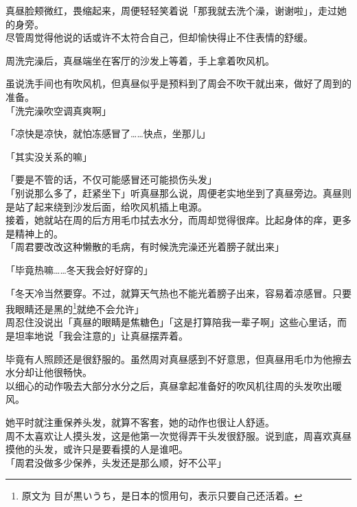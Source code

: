 真昼脸颊微红，畏缩起来，周便轻轻笑着说「那我就去洗个澡，谢谢啦」，走过她的身旁。\\

尽管周觉得他说的话或许不太符合自己，但却愉快得止不住表情的舒缓。\\

\vspace{2\baselineskip}

周洗完澡后，真昼端坐在客厅的沙发上等着，手上拿着吹风机。

虽说洗手间也有吹风机，但真昼似乎是预料到了周会不吹干就出来，做好了周到的准备。\\

「洗完澡吹空调真爽啊」

「凉快是凉快，就怕冻感冒了……快点，坐那儿」

「其实没关系的嘛」

「要是不管的话，不仅可能感冒还可能损伤头发」\\

「别说那么多了，赶紧坐下」听真昼那么说，周便老实地坐到了真昼旁边。真昼则是站了起来绕到沙发后面，给吹风机插上电源。\\

接着，她就站在周的后方用毛巾拭去水分，而周却觉得很痒。比起身体的痒，更多是精神上的。\\

「周君要改改这种懒散的毛病，有时候洗完澡还光着膀子就出来」

「毕竟热嘛……冬天我会好好穿的」

「冬天冷当然要穿。不过，就算天气热也不能光着膀子出来，容易着凉感冒。只要我眼睛还是黑的\footnote{原文为 {\jpfont 目が黒いうち}，是日本的惯用句，表示只要自己还活着。}就绝不会允许」\\

周忍住没说出「真昼的眼睛是焦糖色」「这是打算陪我一辈子啊」这些心里话，而是坦率地说「我会注意的」让真昼摆弄着。

毕竟有人照顾还是很舒服的。虽然周对真昼感到不好意思，但真昼用毛巾为他擦去水分却让他很畅快。\\

以细心的动作吸去大部分水分之后，真昼拿起准备好的吹风机往周的头发吹出暖风。

她平时就注重保养头发，就算不客套，她的动作也很让人舒适。\\

周不太喜欢让人摸头发，这是他第一次觉得弄干头发很舒服。说到底，周喜欢真昼摸他的头发，或许只是要看摸的人是谁吧。\\

「周君没做多少保养，头发还是那么顺，好不公平」\\

